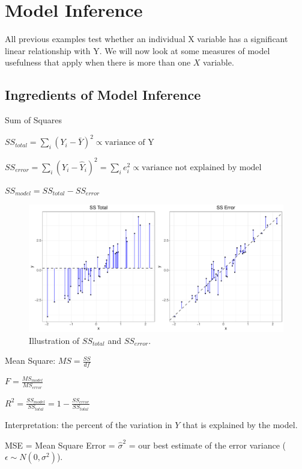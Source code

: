 \documentclass[12pt]{notes}
\begin{document}
\nspace
{}

\begin{minipage}[l][2cm][c]{\textwidth}

\end{minipage}

\section*{Model Inference}
All previous examples test whether an individual X variable has a significant linear relationship with Y. We will now look at some measures of model usefulness that apply when there is more than one $X$ variable. 

\subsection*{Ingredients of Model Inference}
\bi
\item Sum of Squares
\bi
\item $SS_{total} = \sum_i\left(Y_i - \bar{Y}\right)^2 \propto \text{variance of Y}$
\item $SS_{error} = \sum_i\left(Y_i - \hat{Y}_i\right)^2 = \sum_ie_i^2 \propto \text{variance not explained by model}$
\item $SS_{model} = SS_{total} - SS_{error}$
\ei
\ei

\begin{figure}[H]
\includegraphics[width=\textwidth]{figures/module2/ssError.pdf}
\caption{Illustration of $SS_{total}$ and $SS_{error}$.}
\end{figure}

\bi
\item Mean Square: $MS = \frac{SS}{df}$ 
\item $F = \frac{MS_{model}}{MS_{error}}$
\item $R^2 = \frac{SS_{model}}{SS_{total}} = 1 - \frac{SS_{error}}{SS_{total}}$
\bi
\item Interpretation: the percent of the variation in $Y$ that is explained by the model. 
\ei
\item MSE = Mean Square Error = $\hat{\sigma}^2$ = our best estimate of the error variance ($\epsilon \sim N(0, \sigma^2)$).
\ei
\end{document}
